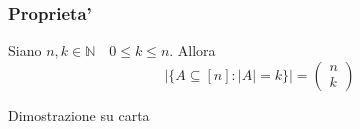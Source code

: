 \documentclass{article}
\begin{document}
      \subsubsection{Proprieta'}
      \begin{flushleft}
        Siano $n,k \in \mathbb{N} \quad 0 \leq k \leq n$. Allora
        \begin{equation}
          \mid \{ A \subseteq [n]: \mid A \mid = k\} \mid = \begin{pmatrix}
            n \\ 
            k
          \end{pmatrix}
        \end{equation}
      \end{flushleft}
      \begin{flushleft}
        Dimostrazione su carta
      \end{flushleft}
\end{document}
